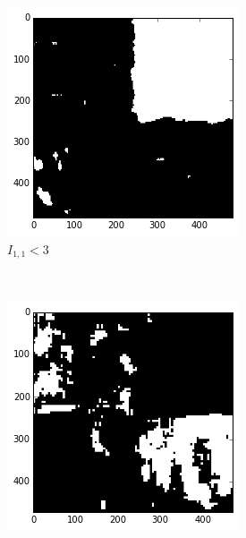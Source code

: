 \documentclass[a4paper]{article}
\begin{document}
\begin{figure}
    \centering
    \begin{subfigure}[b]{0.30\textwidth}
        \centering
        \includegraphics[width=\textwidth]{segm_1_i11.png}
        \caption{%
            $I_{1,1} < 3$
        }
    \end{subfigure}
    ~
    \begin{subfigure}[b]{0.30\textwidth}
        \centering
        \includegraphics[width=\textwidth]{segm_1_c31.png}

\end{subfigure}
\end{figure}
\end{document}
